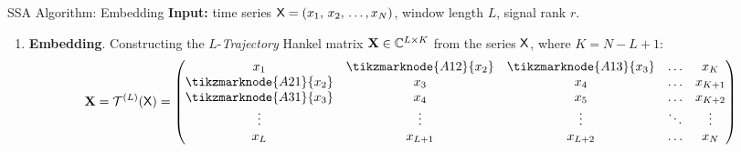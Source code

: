 \documentclass[pdf, unicode, ucs, notheorems]{beamer}
\theoremstyle{definition}
\begin{document}



\begin{frame}{SSA Algorithm: Embedding}
  \textbf{Input:} time series $\mathsf{X} = (x_1,\, x_2,\, \ldots, x_N)$,
  window length $L$, signal rank $r$.
  \vspace{0.4cm}\\
  \begin{enumerate}
    \item \textbf{Embedding}.
      Constructing the $L$-\emph{Trajectory} Hankel matrix $\mathbf{X}\in
      \mathbb{C}^{L \times K}$ from the series $\mathsf{X}$, where $K = N - L + 1$:\\
      \[
        \bfX = \calT^{(L)}(\tX) =
        \begin{pmatrix}
          x_1                     & \tikzmarknode{A12}{x_2} &
          \tikzmarknode{A13}{x_3} & \ldots & x_K     \\
          \tikzmarknode{A21}{x_2} & x_3                     & x_4
          & \ldots & x_{K+1} \\
          \tikzmarknode{A31}{x_3} & x_4                     & x_5
          & \ldots & x_{K+2} \\
          \vdots                  & \vdots                  & \vdots
          & \ddots & \vdots  \\
          x_L                     & x_{L+1}                 & x_{L+2}
          & \ldots & x_N
        \end{pmatrix}
      \]
  \end{enumerate}
\end{frame}
\end{document}
